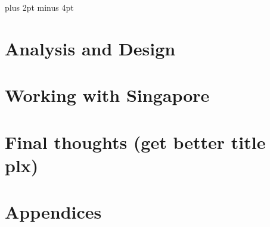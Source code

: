 \documentclass[a4paper,titlepage]{article}
\begin{document}
\parindent=0pt %
\parskip=8pt plus 2pt minus 4pt

\setcounter{page}{1}

\tableofcontents
\newpage

\begin{spacing}{1.15}


\section{Analysis and Design}







\pagebreak
\section{Working with Singapore}

\pagebreak
\section{Final thoughts (get better title plx)}

\end{spacing}
\pagebreak


\newpage
\appendix
\section{Appendices}

\end{document}
